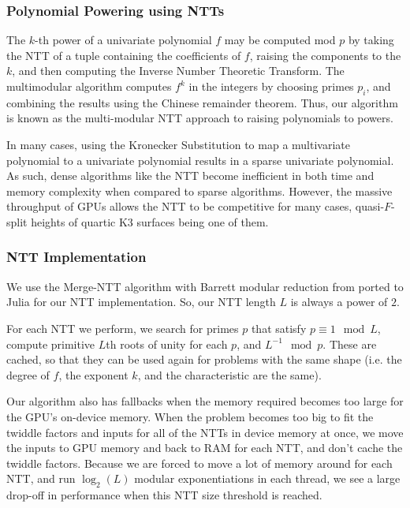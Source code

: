 \subsubsection{Polynomial Powering using NTTs}
The \(k\)-th power of a univariate polynomial \(f\)
may be computed mod \(p\) by taking the NTT 
of a tuple containing the coefficients of \(f\),
raising the components to the \(k\),
and then computing the Inverse Number Theoretic Transform.
The multimodular algorithm 
computes \(f^{k}\) in the integers by
choosing primes \(p_{i}\), 
and combining the results using the Chinese remainder theorem.
Thus, our algorithm is known as the 
multi-modular NTT approach to raising polynomials to powers.

In many cases, using the Kronecker Substitution to 
map a multivariate polynomial to a univariate polynomial results in 
a sparse univariate polynomial. As such, dense 
algorithms like the NTT become inefficient in both 
time and memory complexity when compared to sparse algorithms.
However, the massive throughput of GPUs allows the 
NTT to be competitive for many cases, 
quasi-\(F\)-split heights of quartic K3 surfaces being 
one of them.

\subsubsection{NTT Implementation}

We use the Merge-NTT algorithm with Barrett modular 
reduction from \cite{ozcan-2023-fft} 
ported to Julia for our NTT implementation. 
So, our NTT length $L$ is always a power of $2$. 

For each NTT we perform, we search for primes $p$ that satisfy 
$p \equiv 1 \mod L$, compute primitive $L$th roots of unity 
for each $p$, and $L^{-1} \mod p$. 
These are cached, so that they can be used again for problems with the same shape 
(i.e. the degree of \(f\), the exponent \(k\), and the characteristic are the same).

Our algorithm also has fallbacks when the memory required becomes too large for the 
GPU's on-device memory.
When the problem becomes too big to fit the twiddle factors and 
inputs for all of the NTTs in device memory at once, 
we move the inputs to GPU memory and 
back to RAM for each NTT, and don't cache the twiddle factors. 
Because we are forced to move a lot of memory around for each NTT, 
and run $\log_2(L)$ modular exponentiations in each thread,
we see a large drop-off in 
performance when this NTT size threshold is reached. 


